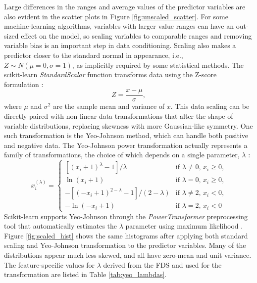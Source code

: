 Large differences in the ranges and average values of the predictor variables are also evident in the scatter plots in Figure \ref{fig:unscaled_scatter}. For some machine-learning algorithms, variables with larger value ranges can have an out-sized effect on the model, so scaling variables to comparable ranges and removing variable bias is an important step in data conditioning. Scaling also makes a predictor closer to the standard normal in appearance, i.e., $Z\sim N(\mu=0, \sigma=1)$, as implicitly required by some statistical methods. The scikit-learn \textit{StandardScalar} function transforms data using the Z-score formulation \citep{scikit-learn_sklearnpreprocessingstandardscaler_2021}:
\begin{equation}
    Z = \frac{x - \mu}{\sigma},
\end{equation}
where $\mu$ and $\sigma^2$ are the sample mean and variance of $x$.
This data scaling can be directly paired with non-linear data transformations that alter the shape of variable distributions, replacing skewness with more Gaussian-like symmetry. One such transformation is the Yeo-Johnson method, which can handle both positive and negative data. The Yeo-Johnson power transformation actually represents a family of transformations, the choice of which depends on a single parameter, $\lambda$ \citep{yeo_new_2000}:
\begin{equation}
    x_i^{(\lambda)} = 
    \begin{cases}
      [(x_i + 1)^{\lambda}-1]/\lambda & \text{if $\lambda \neq 0$, $x_i \geq 0$,}\\
      \ln{(x_i + 1)} & \text{if $\lambda = 0$, $x_i \geq 0$,}\\
      -[(-x_i + 1)^{2-\lambda}-1]/(2-\lambda) & \text{if $\lambda \neq 2$, $x_i < 0$,}\\
      -\ln{(-x_i + 1)} & \text{if $\lambda = 2$, $x_i < 0$}
    \end{cases}  
\end{equation}
Scikit-learn supports Yeo-Johnson through the \textit{PowerTransformer} preprocessing tool that automatically estimates the $\lambda$ parameter using maximum likelihood \citep{scikit-learn_sklearnpreprocessingpowertransformer_2021}. Figure \ref{fig:scaled_hist} shows the same histograms after applying both standard scaling and Yeo-Johnson transformation to the predictor variables. Many of the distributions appear much less skewed, and all have zero-mean and unit variance. The feature-specific values for $\lambda$ derived from the FDS and used for the transformation are listed in Table \ref{tab:yeo_lambdas}. 

